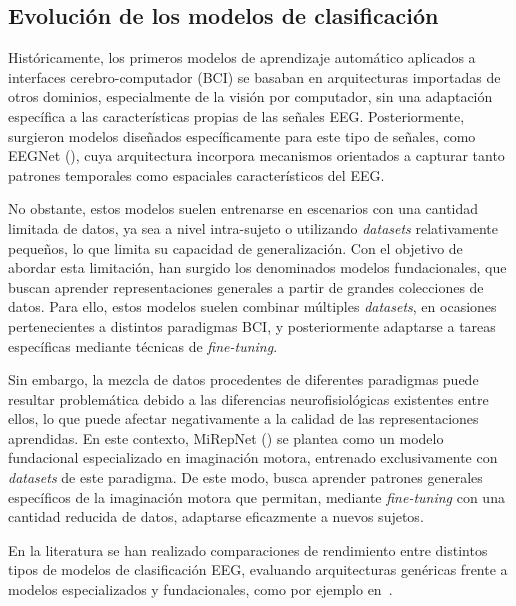 \subsection{Evolución de los modelos de clasificación}
\label{subsec:evolucionModelos}

Históricamente, los primeros modelos de aprendizaje automático aplicados a interfaces cerebro-computador (BCI) se basaban en arquitecturas importadas de otros dominios, especialmente de la visión por computador, sin una adaptación específica a las características propias de las señales EEG. Posteriormente, surgieron modelos diseñados específicamente para este tipo de señales, como EEGNet (\cite{lawhern2018eegnet}), cuya arquitectura incorpora mecanismos orientados a capturar tanto patrones temporales como espaciales característicos del EEG.

No obstante, estos modelos suelen entrenarse en escenarios con una cantidad limitada de datos, ya sea a nivel intra-sujeto o utilizando \textit{datasets} relativamente pequeños, lo que limita su capacidad de generalización. Con el objetivo de abordar esta limitación, han surgido los denominados modelos fundacionales, que buscan aprender representaciones generales a partir de grandes colecciones de datos. Para ello, estos modelos suelen combinar múltiples \textit{datasets}, en ocasiones pertenecientes a distintos paradigmas BCI, y posteriormente adaptarse a tareas específicas mediante técnicas de \textit{fine-tuning}.

Sin embargo, la mezcla de datos procedentes de diferentes paradigmas puede resultar problemática debido a las diferencias neurofisiológicas existentes entre ellos, lo que puede afectar negativamente a la calidad de las representaciones aprendidas. En este contexto, MiRepNet (\cite{liu2025mirepnetpipelinefoundationmodel}) se plantea como un modelo fundacional especializado en imaginación motora, entrenado exclusivamente con \textit{datasets} de este paradigma. De este modo, busca aprender patrones generales específicos de la imaginación motora que permitan, mediante \textit{fine-tuning} con una cantidad reducida de datos, adaptarse eficazmente a nuevos sujetos.

En la literatura se han realizado comparaciones de rendimiento entre distintos tipos de modelos de clasificación EEG, evaluando arquitecturas genéricas frente a modelos especializados y fundacionales, como por ejemplo en~\cite{liu2025mirepnetpipelinefoundationmodel}.

